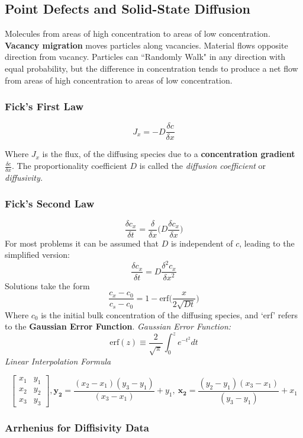 \documentclass[10pt,letterpaper]{article}
\begin{document}
	\subsection{Point Defects and Solid-State Diffusion}
	Molecules from areas of high concentration to areas of low concentration. \textbf{Vacancy migration} moves particles along vacancies.  Material flows opposite direction from vacancy. Particles can ``Randomly Walk" in any direction with equal probability, but the difference in concentration tends to produce a net flow from areas of high concentration to areas of low concentration. 
	
	\subsubsection*{Fick's First Law}
	$$
	J_x = -D\frac{\delta c}{\delta x}
	$$
	
	Where $J_x$ is the flux, of the diffusing species due to a \textbf{concentration gradient} $\frac{\delta c}{\delta x}$. The proportionality coefficient $D$ is called the \textit{diffusion coefficient} or \textit{diffusivity.} 
	
	\subsubsection*{Fick's Second Law}
	$$
	\frac{\delta c_x}{\delta t} = \frac{\delta }{\delta x} \bigg(D \frac{\delta c_x}{\delta x} \bigg)
	$$
	For most problems it can be assumed that $D$ is independent of $c$, leading to the simplified version:
	$$
	\frac{\delta c_x}{\delta t} = D \frac{\delta^2 c_x}{\delta x^2} 
	$$
	Solutions take the form
	$$
	\frac{c_x - c_0}{c_s - c_0} = 1 - \text{erf} \bigg( \frac{x}{2 \sqrt{Dt}} \bigg)
	$$
	Where $c_0$ is the initial bulk concentration of the diffusing species, and `erf' refers to the \textbf{Gaussian Error Function}. 
	\textit{Gaussian Error Function: }
	$$
	\text{erf}(z) \equiv \frac{2}{\sqrt{\pi}} \int_0^z{e^{-t^2} dt}
	$$
	\textit{Linear Interpolation Formula}
	
	$$\begin{bmatrix}
	x_1 & y_1 \\ 
	x_2 & y_2 \\ 
	x_3 & y_3
	\end{bmatrix}, \mathbf{y_2} = \frac{(x_2-x_1)(y_3-y_1)}{(x_3 - x_1)} + y_1, \: \mathbf{x_2} = \frac{(y_2-y_1)(x_3-x_1)}{(y_3-y_1)} + x_1
	$$
	\subsubsection*{Arrhenius for Diffisivity Data}
	
\end{document}
